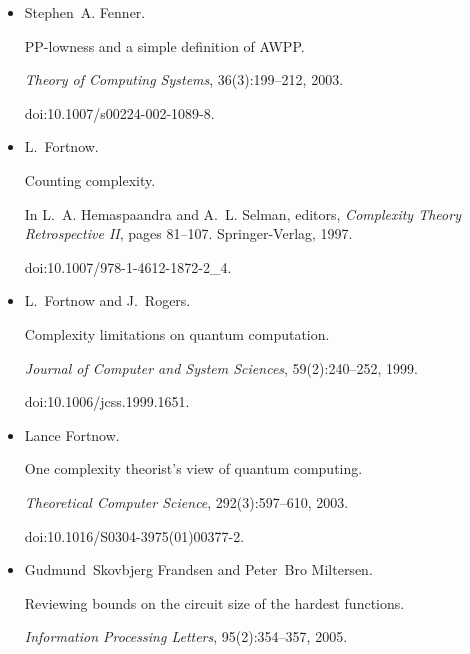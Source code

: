 \begin{itemize}
doi:10.1016/S0890-5401(03)00018-X.





\item[] 
[20]

Stephen A. Fenner.


PP-lowness and a simple definition of AWPP.


\emph{Theory of Computing Systems}, 36(3):199–212, 2003.


doi:10.1007/s00224-002-1089-8.





\item[] 
[21]

L. Fortnow.


Counting complexity.


In L. A. Hemaspaandra and A. L. Selman, editors, \emph{Complexity
Theory Retrospective II}, pages 81–107. Springer-Verlag, 1997.


doi:10.1007/978-1-4612-1872-2\_4.





\item[] 
[22]

L. Fortnow and J. Rogers.


Complexity limitations on quantum computation.


\emph{Journal of Computer and System Sciences}, 59(2):240–252, 1999.


doi:10.1006/jcss.1999.1651.





\item[] 
[23]

Lance Fortnow.


One complexity theorist’s view of quantum computing.


\emph{Theoretical Computer Science}, 292(3):597–610, 2003.


doi:10.1016/S0304-3975(01)00377-2.





\item[] 
[24]

Gudmund Skovbjerg Frandsen and Peter Bro Miltersen.


Reviewing bounds on the circuit size of the hardest functions.


\emph{Information Processing Letters}, 95(2):354–357, 2005.



\end{itemize}
